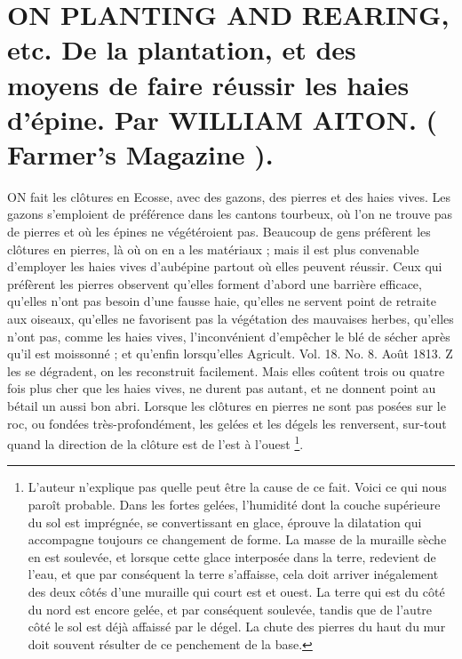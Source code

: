 \setcounter{page}{289}
\section{ON PLANTING AND REARING, etc. De la plantation, et des moyens de faire réussir les haies d'épine. Par WILLIAM AITON. ( Farmer's Magazine ).}
ON fait les clôtures en Ecosse, avec des gazons, des pierres et des haies vives. Les gazons s'emploient de préférence dans les cantons tourbeux, où l'on ne trouve pas de pierres et où les épines ne végétéroient pas. Beaucoup de gens préfèrent les clôtures en pierres, là où on en a les matériaux ; mais il est plus convenable d'employer les haies vives d'aubépine partout où elles peuvent réussir. Ceux qui préfèrent les pierres observent qu'elles forment d'abord une barrière efficace, qu'elles n'ont pas besoin d'une fausse haie, qu'elles ne servent point de retraite aux oiseaux, qu'elles ne favorisent pas la végétation des mauvaises herbes, qu'elles n'ont pas, comme les haies vives, l'inconvénient d'empêcher le blé de sécher après qu'il est moissonné ; et qu'enfin lorsqu'elles
Agricult. Vol. 18. No. 8. Août 1813. Z\setcounter{page}{290} les se dégradent, on les reconstruit facilement. Mais elles coûtent trois ou quatre fois plus cher que les haies vives, ne durent pas autant, et ne donnent point au bétail un aussi bon abri. Lorsque les clôtures en pierres ne sont pas posées sur le roc, ou fondées très-profondément, les gelées et les dégels les renversent, sur-tout quand la direction de la clôture est de l'est à l'ouest \footnote{L'auteur n'explique pas quelle peut être la cause de ce fait. Voici ce qui nous paroît probable. Dans les fortes gelées, l'humidité dont la couche supérieure du sol est imprégnée, se convertissant en glace, éprouve la dilatation qui accompagne toujours ce changement de forme. La masse de la muraille sèche en est soulevée, et lorsque cette glace interposée dans la terre, redevient de l'eau, et que par conséquent la terre s'affaisse, cela doit arriver inégalement des deux côtés d'une muraille qui court est et ouest. La terre qui est du côté du nord est encore gelée, et par conséquent soulevée, tandis que de l'autre côté le sol est déjà affaissé par le dégel. La chute des pierres du haut du mur doit souvent résulter de ce penchement de la base.}.
